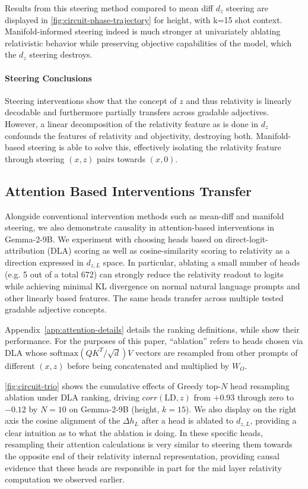 \documentclass{article}
\begin{document}
Results from this steering method compared to mean diff $d_z$ steering are displayed in \cref{fig:circuit-phase-trajectory} for height, with k=15 shot context. Manifold-informed steering indeed is much stronger at univariately ablating relativistic behavior while preserving objective capabilities of the model, which the $d_z$ steering destroys. 


\paragraph{Steering Conclusions}
Steering interventions show that the concept of $z$ and thus relativity is linearly decodable and furthermore partially transfers across gradable adjectives. However, a linear decomposition of the relativity feature as is done in $d_z$ confounds the features of relativity and objectivity, destroying both. Manifold-based steering is able to solve this, effectively isolating the relativity feature through steering $(x,z)$ pairs towards $(x,0)$. 

\subsection{Attention Based Interventions Transfer}
\label{subsec:attention}

Alongside conventional intervention methods such as mean-diff and manifold steering, we also demonstrate causality in attention-based interventions in Gemma-2-9B. We experiment with choosing heads based on direct-logit-attribution (DLA) \citep{elhage2021transformer} scoring as well as cosine-similarity scoring to relativity as a direction expressed in $d_{z,L}$ space. In particular, ablating a small number of heads (e.g. 5 out of a total 672) can strongly reduce the relativity readout to logits while achieving minimal KL divergence on normal natural language prompts and other linearly based features. The same heads transfer across multiple tested gradable adjective concepts.

Appendix~\ref{app:attention-details} details the ranking definitions, while  show their performance. For the purposes of this paper, ``ablation'' refers to heads chosen via DLA whose $\mathrm{softmax}(QK^T/\sqrt{d}) V$ vectors are resampled from other prompts of different $(x,z)$ before being concatenated and multiplied by $W_O$.

\cref{fig:circuit-trio} shows the cumulative effects of Greedy top-$N$ head resampling ablation under DLA ranking, driving $corr(\mathrm{LD}, z)$ from $+0.93$ through zero to $-0.12$ by $N{=}10$ on Gemma-2-9B (height, $k{=}15$). We also display on the right axis the cosine alignment of the $\Delta h_L$ after a head is ablated to $d_{z,L}$, providing a clear intuition as to what the ablation is doing. In these specific heads, resampling their attention calculations is very similar to steering them towards the opposite end of their relativity internal representation, providing causal evidence that these heads are responsible in part for the mid layer relativity computation we observed earlier. 
\end{document}
